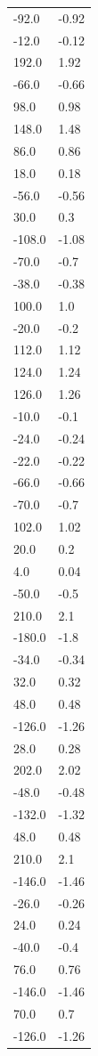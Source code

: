 \begin{longtable}{ll}
-92.0 & -0.92 \\
-12.0 & -0.12 \\
192.0 & 1.92 \\
-66.0 & -0.66 \\
98.0 & 0.98 \\
148.0 & 1.48 \\
86.0 & 0.86 \\
18.0 & 0.18 \\
-56.0 & -0.56 \\
30.0 & 0.3 \\
-108.0 & -1.08 \\
-70.0 & -0.7 \\
-38.0 & -0.38 \\
100.0 & 1.0 \\
-20.0 & -0.2 \\
112.0 & 1.12 \\
124.0 & 1.24 \\
126.0 & 1.26 \\
-10.0 & -0.1 \\
-24.0 & -0.24 \\
-22.0 & -0.22 \\
-66.0 & -0.66 \\
-70.0 & -0.7 \\
102.0 & 1.02 \\
20.0 & 0.2 \\
4.0 & 0.04 \\
-50.0 & -0.5 \\
210.0 & 2.1 \\
-180.0 & -1.8 \\
-34.0 & -0.34 \\
32.0 & 0.32 \\
48.0 & 0.48 \\
-126.0 & -1.26 \\
28.0 & 0.28 \\
202.0 & 2.02 \\
-48.0 & -0.48 \\
-132.0 & -1.32 \\
48.0 & 0.48 \\
210.0 & 2.1 \\
-146.0 & -1.46 \\
-26.0 & -0.26 \\
24.0 & 0.24 \\
-40.0 & -0.4 \\
76.0 & 0.76 \\
-146.0 & -1.46 \\
70.0 & 0.7 \\
-126.0 & -1.26 \\

\end{longtable}

